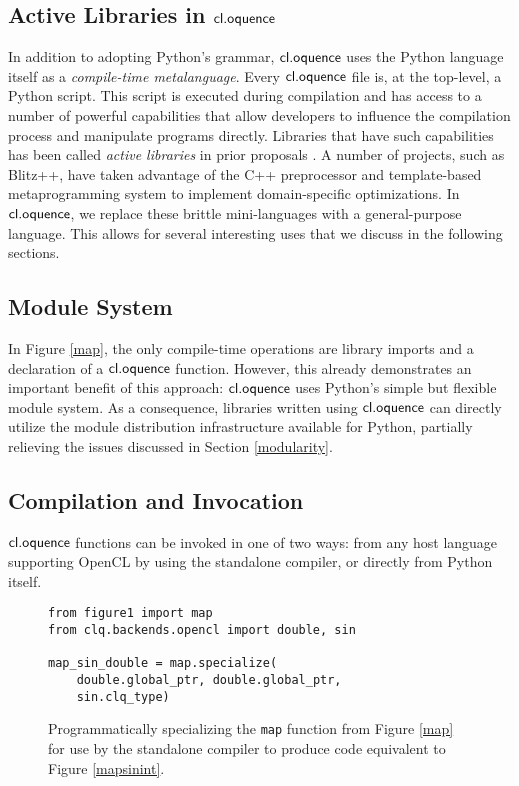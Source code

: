 \documentclass[10pt, conference, compsocconf]{IEEEtran}
\begin{document}
\subsection{Active Libraries in $\textsf{cl.oquence}$}
In addition to adopting Python's grammar, $\textsf{cl.oquence}$ uses the Python language itself as a {\it compile-time metalanguage}. Every $\textsf{cl.oquence}$ file is, at the top-level, a Python script. This script is executed during compilation and has access to a number of powerful capabilities that allow developers to influence the compilation process and manipulate programs directly. Libraries that have such capabilities has been called {\it active libraries} in prior proposals \cite{activelibraries}. A number of  projects, such as Blitz++, have taken advantage of the C++ preprocessor and template-based metaprogramming system to implement domain-specific optimizations. In $\textsf{cl.oquence}$, we replace these brittle mini-languages with a general-purpose language. This allows for several interesting uses that we discuss in the following sections.

\subsection{Module System}
In Figure \ref{map}, the only compile-time operations are library imports and a declaration of a $\textsf{cl.oquence}$ function. However, this already demonstrates an important benefit of this approach: $\textsf{cl.oquence}$ uses Python's simple but flexible module system. As a consequence, libraries written using $\textsf{cl.oquence}$ can directly utilize the module distribution infrastructure available for Python, partially relieving the issues discussed in Section \ref{modularity}.

\subsection{Compilation and Invocation}
$\textsf{cl.oquence}$ functions can be invoked in one of two ways: from any host language supporting OpenCL by using the standalone compiler, or directly from Python itself. 
\begin{figure}\small{\begin{verbatim}
from figure1 import map
from clq.backends.opencl import double, sin

map_sin_double = map.specialize(
    double.global_ptr, double.global_ptr, 
    sin.clq_type)
\end{verbatim}}
\caption{Programmatically specializing the \texttt{map} function from Figure \ref{map} for use by the standalone compiler to produce code equivalent to Figure \ref{mapsinint}.}
\label{specialization}
\end{figure}
\end{document}
